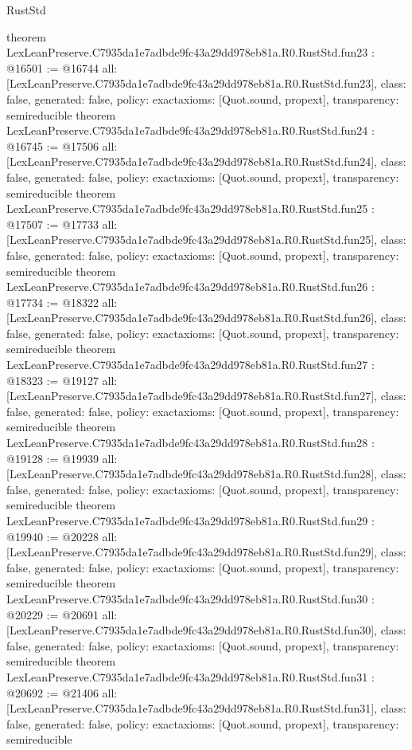 \begin{lexlean}{RustStd}
\begin{coremodule}
{}
theorem LexLeanPreserve.C7935da1e7adbde9fc43a29dd978eb81a.R0.RustStd.fun23 : @16501 := @16744 {
  all: [LexLeanPreserve.C7935da1e7adbde9fc43a29dd978eb81a.R0.RustStd.fun23],
  class: false,
  generated: false,
  policy: exact{axioms: [Quot.sound, propext]},
  transparency: semireducible
}
theorem LexLeanPreserve.C7935da1e7adbde9fc43a29dd978eb81a.R0.RustStd.fun24 : @16745 := @17506 {
  all: [LexLeanPreserve.C7935da1e7adbde9fc43a29dd978eb81a.R0.RustStd.fun24],
  class: false,
  generated: false,
  policy: exact{axioms: [Quot.sound, propext]},
  transparency: semireducible
}
theorem LexLeanPreserve.C7935da1e7adbde9fc43a29dd978eb81a.R0.RustStd.fun25 : @17507 := @17733 {
  all: [LexLeanPreserve.C7935da1e7adbde9fc43a29dd978eb81a.R0.RustStd.fun25],
  class: false,
  generated: false,
  policy: exact{axioms: [Quot.sound, propext]},
  transparency: semireducible
}
theorem LexLeanPreserve.C7935da1e7adbde9fc43a29dd978eb81a.R0.RustStd.fun26 : @17734 := @18322 {
  all: [LexLeanPreserve.C7935da1e7adbde9fc43a29dd978eb81a.R0.RustStd.fun26],
  class: false,
  generated: false,
  policy: exact{axioms: [Quot.sound, propext]},
  transparency: semireducible
}
theorem LexLeanPreserve.C7935da1e7adbde9fc43a29dd978eb81a.R0.RustStd.fun27 : @18323 := @19127 {
  all: [LexLeanPreserve.C7935da1e7adbde9fc43a29dd978eb81a.R0.RustStd.fun27],
  class: false,
  generated: false,
  policy: exact{axioms: [Quot.sound, propext]},
  transparency: semireducible
}
theorem LexLeanPreserve.C7935da1e7adbde9fc43a29dd978eb81a.R0.RustStd.fun28 : @19128 := @19939 {
  all: [LexLeanPreserve.C7935da1e7adbde9fc43a29dd978eb81a.R0.RustStd.fun28],
  class: false,
  generated: false,
  policy: exact{axioms: [Quot.sound, propext]},
  transparency: semireducible
}
theorem LexLeanPreserve.C7935da1e7adbde9fc43a29dd978eb81a.R0.RustStd.fun29 : @19940 := @20228 {
  all: [LexLeanPreserve.C7935da1e7adbde9fc43a29dd978eb81a.R0.RustStd.fun29],
  class: false,
  generated: false,
  policy: exact{axioms: [Quot.sound, propext]},
  transparency: semireducible
}
theorem LexLeanPreserve.C7935da1e7adbde9fc43a29dd978eb81a.R0.RustStd.fun30 : @20229 := @20691 {
  all: [LexLeanPreserve.C7935da1e7adbde9fc43a29dd978eb81a.R0.RustStd.fun30],
  class: false,
  generated: false,
  policy: exact{axioms: [Quot.sound, propext]},
  transparency: semireducible
}
theorem LexLeanPreserve.C7935da1e7adbde9fc43a29dd978eb81a.R0.RustStd.fun31 : @20692 := @21406 {
  all: [LexLeanPreserve.C7935da1e7adbde9fc43a29dd978eb81a.R0.RustStd.fun31],
  class: false,
  generated: false,
  policy: exact{axioms: [Quot.sound, propext]},
  transparency: semireducible
}
\end{coremodule}
\end{lexlean}

